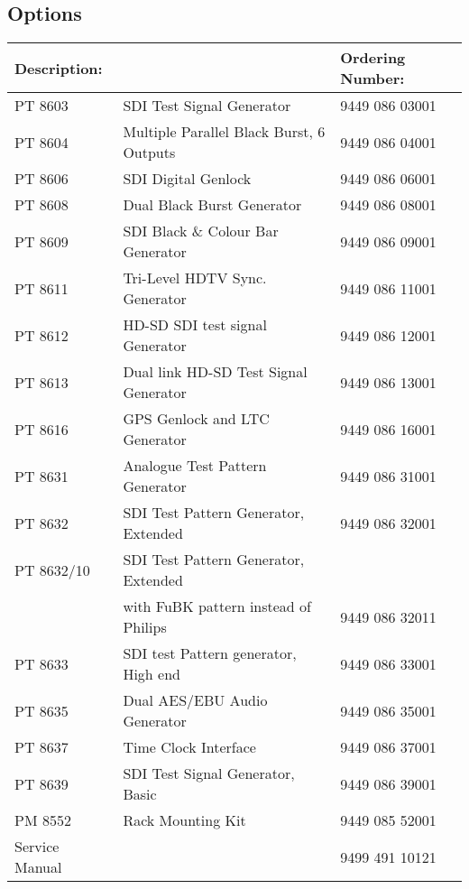 \subsection{Options}
\begin{tabular*}{\textwidth}{@{\extracolsep{\fill}}l l l}
\hline
Description: 							& &	Ordering Number: \\
\hline
PT 8603	& SDI Test Signal Generator 								& 9449 086 03001 \\
PT 8604	& Multiple Parallel Black Burst, 6 Outputs 	& 9449 086 04001 \\
PT 8606	& SDI Digital Genlock											& 9449 086 06001 \\
PT 8608	& Dual Black Burst Generator								& 9449 086 08001 \\
PT 8609	& SDI Black \& Colour Bar Generator					& 9449 086 09001 \\
PT 8611	& Tri-Level HDTV Sync. Generator						& 9449 086 11001 \\
PT 8612	& HD-SD SDI test signal Generator						& 9449 086 12001 \\
PT 8613	& Dual link HD-SD Test Signal Generator			& 9449 086 13001 \\
PT 8616	& GPS Genlock and LTC Generator							& 9449 086 16001 \\
PT 8631	& Analogue Test Pattern Generator						& 9449 086 31001 \\
PT 8632	& SDI Test Pattern Generator, Extended 			& 9449 086 32001 \\
PT 8632/10	& SDI Test Pattern Generator, Extended &   \\
						& with FuBK pattern instead of Philips & 9449 086 32011 \\
PT 8633	& SDI test Pattern generator, High end				& 9449 086 33001 \\
PT 8635	& Dual AES/EBU Audio Generator								& 9449 086 35001 \\
PT 8637	& Time Clock Interface													& 9449 086 37001 \\
PT 8639	& SDI Test Signal Generator, Basic							& 9449 086 39001 \\
PM 8552	& Rack Mounting Kit														& 9449 085 52001 \\
Service Manual	&																		& 9499 491 10121 \\
\end{tabular*}
